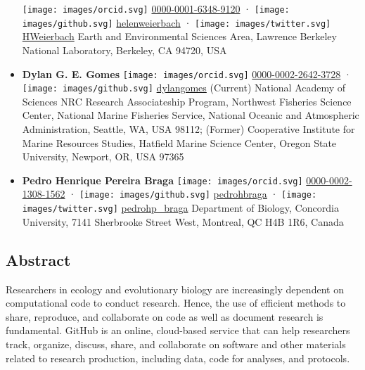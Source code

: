\begin{itemize}
  \texttt{[image: images/orcid.svg]}
  \href{https://orcid.org/0000-0001-6348-9120}{0000-0001-6348-9120}
  · \texttt{[image: images/github.svg]}
  \href{https://github.com/helenweierbach}{helenweierbach}
  · \texttt{[image: images/twitter.svg]}
  \href{https://twitter.com/HWeierbach}{HWeierbach}
  Earth and Environmental Sciences Area, Lawrence Berkeley National Laboratory, Berkeley, CA 94720, USA
\item
  \textbf{Dylan G. E. Gomes}
  \texttt{[image: images/orcid.svg]}
  \href{https://orcid.org/0000-0002-2642-3728}{0000-0002-2642-3728}
  · \texttt{[image: images/github.svg]}
  \href{https://github.com/dylangomes}{dylangomes}
  (Current) National Academy of Sciences NRC Research Associateship Program, Northwest Fisheries Science Center, National Marine Fisheries Service, National Oceanic and Atmospheric Administration, Seattle, WA, USA 98112; (Former) Cooperative Institute for Marine Resources Studies, Hatfield Marine Science Center, Oregon State University, Newport, OR, USA 97365
\item
  \textbf{Pedro Henrique Pereira Braga}
  \texttt{[image: images/orcid.svg]}
  \href{https://orcid.org/0000-0002-1308-1562}{0000-0002-1308-1562}
  · \texttt{[image: images/github.svg]}
  \href{https://github.com/pedrohbraga}{pedrohbraga}
  · \texttt{[image: images/twitter.svg]}
  \href{https://twitter.com/pedrohp_braga}{pedrohp\_braga}
  Department of Biology, Concordia University, 7141 Sherbrooke Street West, Montreal, QC H4B 1R6, Canada
\end{itemize}

\hypertarget{abstract}{%
\subsection{Abstract}\label{abstract}}

Researchers in ecology and evolutionary biology are increasingly dependent on computational code to conduct research. Hence, the use of efficient methods to share, reproduce, and collaborate on code as well as document research is fundamental.
GitHub is an online, cloud-based service that can help researchers track, organize, discuss, share, and collaborate on software and other materials related to research production, including data, code for analyses, and protocols.

